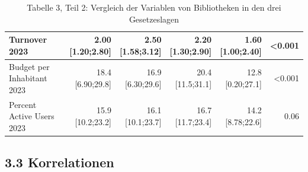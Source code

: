 \documentclass[a4paper,
fontsize=11pt,
oneside,
numbers=noperiodatend,
parskip=half-,
bibliography=totoc,
final
]{scrartcl}
\begin{document}
\begin{landscape}
\begin{table}[]
\begin{tabular}{lrrrrr}
Turnover 2023                    & \makecell{2.00 \\ {[}1.20;2.80{]}}     & \makecell{2.50 \\ {[}1.58;3.12{]}}     & \makecell{2.20 \\ {[}1.30;2.90{]}}     & \makecell{1.60 \\ {[}1.00;2.40{]}}   & \textless{}0.001   \\ \hline
Budget per Inhabitant 2023       & \makecell{18.4 \\ {[}6.90;29.8{]}}     & \makecell{16.9 \\ {[}6.30;29.6{]}}     & \makecell{20.4 \\ {[}11.5;31.1{]}}     & \makecell{12.8 \\ {[}0.20;27.1{]}}   & \textless{}0.001   \\ \hline
Percent Active Users 2023        & \makecell{15.9 \\ {[}10.2;23.2{]}}     & \makecell{16.1 \\ {[}10.1;23.7{]}}     & \makecell{16.7 \\ {[}11.7;23.4{]}}     & \makecell{14.2 \\ {[}8.78;22.6{]}}   & 0.06               \\ \hline
\end{tabular}
\caption{Tabelle 3, Teil 2: Vergleich der Variablen von Bibliotheken in den drei Gesetzeslagen}
\end{table}
\end{landscape}


\subsection{3.3 Korrelationen}\label{korrelationen}
\end{document}
